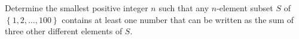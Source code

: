 Determine the smallest positive integer $n$ such that any $n$-element subset $S$
of $\left\{1,2,\ldots,100\right\}$ contains at least one number that can be written as the
sum of three other different elements of $S$.
